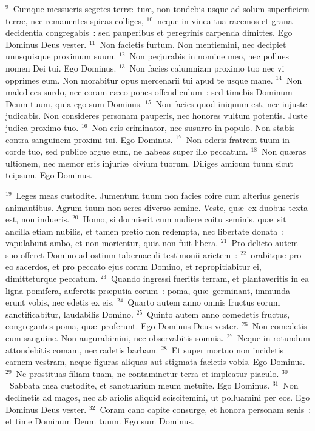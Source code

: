 ${}^{9}$~Cumque messueris segetes terr\ae\ tu\ae , non tondebis usque ad solum superficiem terr\ae , nec remanentes spicas colliges,
${}^{10}$~neque in vinea tua racemos et grana decidentia congregabis~: sed pauperibus et peregrinis carpenda dimittes. Ego Dominus Deus vester.
${}^{11}$~Non facietis furtum. Non mentiemini, nec decipiet unusquisque proximum suum.
${}^{12}$~Non perjurabis in nomine meo, nec pollues nomen Dei tui. Ego Dominus.
${}^{13}$~Non facies calumniam proximo tuo nec vi opprimes eum. Non morabitur opus mercenarii tui apud te usque mane.
${}^{14}$~Non maledices surdo, nec coram c\ae co pones offendiculum~: sed timebis Dominum Deum tuum, quia ego sum Dominus.
${}^{15}$~Non facies quod iniquum est, nec injuste judicabis. Non consideres personam pauperis, nec honores vultum potentis. Juste judica proximo tuo.
${}^{16}$~Non eris criminator, nec susurro in populo. Non stabis contra sanguinem proximi tui. Ego Dominus.
${}^{17}$~Non oderis fratrem tuum in corde tuo, sed publice argue eum, ne habeas super illo peccatum.
${}^{18}$~Non qu\ae ras ultionem, nec memor eris injuri\ae\ civium tuorum. Diliges amicum tuum sicut teipsum. Ego Dominus.


${}^{19}$~Leges meas custodite. Jumentum tuum non facies coire cum alterius generis animantibus. Agrum tuum non seres diverso semine. Veste, qu\ae\ ex duobus texta est, non indueris.
${}^{20}$~Homo, si dormierit cum muliere coitu seminis, qu\ae\ sit ancilla etiam nubilis, et tamen pretio non redempta, nec libertate donata~: vapulabunt ambo, et non morientur, quia non fuit libera.
${}^{21}$~Pro delicto autem suo offeret Domino ad ostium tabernaculi testimonii arietem~:
${}^{22}$~orabitque pro eo sacerdos, et pro peccato ejus coram Domino, et repropitiabitur ei, dimitteturque peccatum.
${}^{23}$~Quando ingressi fueritis terram, et plantaveritis in ea ligna pomifera, auferetis pr\ae putia eorum~: poma, qu\ae\ germinant, immunda erunt vobis, nec edetis ex eis.
${}^{24}$~Quarto autem anno omnis fructus eorum sanctificabitur, laudabilis Domino.
${}^{25}$~Quinto autem anno comedetis fructus, congregantes poma, qu\ae\ proferunt. Ego Dominus Deus vester.
${}^{26}$~Non comedetis cum sanguine. Non augurabimini, nec observabitis somnia.
${}^{27}$~Neque in rotundum attondebitis comam, nec radetis barbam.
${}^{28}$~Et super mortuo non incidetis carnem vestram, neque figuras aliquas aut stigmata facietis vobis. Ego Dominus.
${}^{29}$~Ne prostituas filiam tuam, ne contaminetur terra et impleatur piaculo.
${}^{30}$~Sabbata mea custodite, et sanctuarium meum metuite. Ego Dominus.
${}^{31}$~Non declinetis ad magos, nec ab ariolis aliquid sciscitemini, ut polluamini per eos. Ego Dominus Deus vester.
${}^{32}$~Coram cano capite consurge, et honora personam senis~: et time Dominum Deum tuum. Ego sum Dominus.


